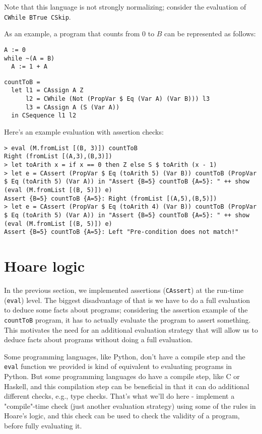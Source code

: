 \documentclass{article}
\begin{document}
Note that this language is not strongly normalizing; consider the evaluation of \texttt{CWhile BTrue CSkip}.

As an example, a program that counts from 0 to $B$ can be represented as follows:

\begin{minipage}{0.29\textwidth}
\begin{lstlisting}
A := 0
while ~(A = B)
  A := 1 + A
\end{lstlisting}
\end{minipage}
\begin{minipage}{0.69\textwidth}
\begin{lstlisting}
countToB =
  let l1 = CAssign A Z
      l2 = CWhile (Not (PropVar $ Eq (Var A) (Var B))) l3
      l3 = CAssign A (S (Var A))
  in CSequence l1 l2
\end{lstlisting}
\end{minipage}

Here's an example evaluation with assertion checks:

\begin{lstlisting}
> eval (M.fromList [(B, 3)]) countToB
Right (fromList [(A,3),(B,3)])
> let toArith x = if x == 0 then Z else S $ toArith (x - 1)
> let e = CAssert (PropVar $ Eq (toArith 5) (Var B)) countToB (PropVar $ Eq (toArith 5) (Var A)) in "Assert {B=5} countToB {A=5}: " ++ show (eval (M.fromList [(B, 5)]) e)
Assert {B=5} countToB {A=5}: Right (fromList [(A,5),(B,5)])
> let e = CAssert (PropVar $ Eq (toArith 4) (Var B)) countToB (PropVar $ Eq (toArith 5) (Var A)) in "Assert {B=5} countToB {A=5}: " ++ show (eval (M.fromList [(B, 5)]) e)
Assert {B=5} countToB {A=5}: Left "Pre-condition does not match!"
\end{lstlisting}

\section{Hoare logic}

In the previous section, we implemented assertions (\texttt{CAssert}) at the run-time (\texttt{eval}) level. The biggest disadvantage of that is we have to do a full evaluation to deduce some facts about programs; considering the assertion example of the \texttt{countToB} program, it has to actually evaluate the program to assert something. This motivates the need for an additional evaluation strategy that will allow us to deduce facts about programs without doing a full evaluation.

Some programming languages, like Python, don't have a compile step and the \texttt{eval} function we provided is kind of equivalent to evaluating programs in Python. But some programming languages do have a compile step, like C or Haskell, and this compilation step can be beneficial in that it can do additional different checks, e.g., type checks. That's what we'll do here - implement a "compile"-time check (just another evaluation strategy) using some of the rules in Hoare's logic, and this check can be used to check the validity of a program, before fully evaluating it.
\end{document}
